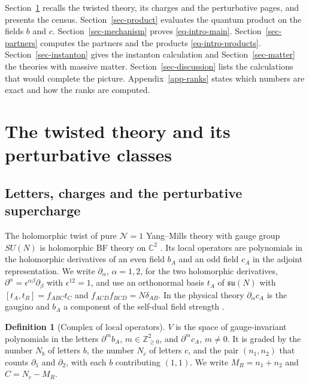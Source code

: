 \documentclass[11pt]{article}
\numberwithin{equation}{section}
\numberwithin{figure}{section}
\numberwithin{table}{section}
\theoremstyle{definition}
\newtheorem{definition}[theorem]{Definition}
\begin{document}
Section~\ref{sec-setup} recalls the twisted theory, its charges and the perturbative pages, and presents the census. Section~\ref{sec-product} evaluates the quantum product on the fields $b$ and $c$. Section~\ref{sec-mechanism} proves \eqref{eq-intro-main}. Section~\ref{sec-partners} computes the partners and the products \eqref{eq-intro-products}. Section~\ref{sec-instanton} gives the instanton calculation and Section~\ref{sec-matter} the theories with massive matter. Section~\ref{sec-discussion} lists the calculations that would complete the picture. Appendix~\ref{app-ranks} states which numbers are exact and how the ranks are computed.

\section{The twisted theory and its perturbative classes}\label{sec-setup}

\subsection{Letters, charges and the perturbative supercharge}\label{sec-letters}

The holomorphic twist of pure $\mathcal N=1$ Yang--Mills theory with gauge group $SU(N)$ is holomorphic BF theory on $\mathbb C^2$ \cite[Section~3]{semichiral}. Its local operators are polynomials in the holomorphic derivatives of an even field $b_A$ and an odd field $c_A$ in the adjoint representation. We write $\partial_\alpha$, $\alpha=1,2$, for the two holomorphic derivatives, $\partial^\alpha=\epsilon^{\alpha\beta}\partial_\beta$ with $\epsilon^{12}=1$, and use an orthonormal basis $t_A$ of $\mathfrak{su}(N)$ with $[t_A,t_B]=f_{ABC}t_C$ and $f_{ACD}f_{BCD}=N\delta_{AB}$. In the physical theory $\partial_\alpha c_A$ is the gaugino and $b_A$ a component of the self-dual field strength \cite[Proposition~3.1 and Equation~(3.2)]{LLCh}.

\begin{definition}[Complex of local operators]\label{def-V}
$V$ is the space of gauge-invariant polynomials in the letters $\partial^mb_A$, $m\in\mathbb Z_{\ge0}^2$, and $\partial^mc_A$, $m\ne0$. It is graded by the number $N_b$ of letters $b$, the number $N_c$ of letters $c$, and the pair $(n_1,n_2)$ that counts $\partial_1$ and $\partial_2$, with each $b$ contributing $(1,1)$. We write $M_R=n_1+n_2$ and $C=N_c-M_R$.
\end{definition}
\end{document}
